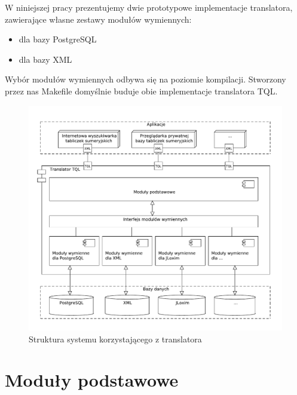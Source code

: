  W niniejszej pracy prezentujemy dwie prototypowe implementacje translatora, zawierające własne zestawy modułów wymiennych:
  \begin{itemize}
   \item dla bazy PostgreSQL
   \item dla bazy XML
  \end{itemize}
  Wybór modułów wymiennych odbywa się na poziomie kompilacji.
 Stworzony przez nas Makefile domyślnie buduje obie implementacje translatora TQL.

\begin{figure}[h]
 \centering
 \includegraphics[width=450px,bb=0 0 608 517]{../diagramy/struktura2.pdf}
 \caption{Struktura systemu korzystającego z translatora}
 \label{struktura_systemu}
\end{figure}

\chapter{Moduły podstawowe}


